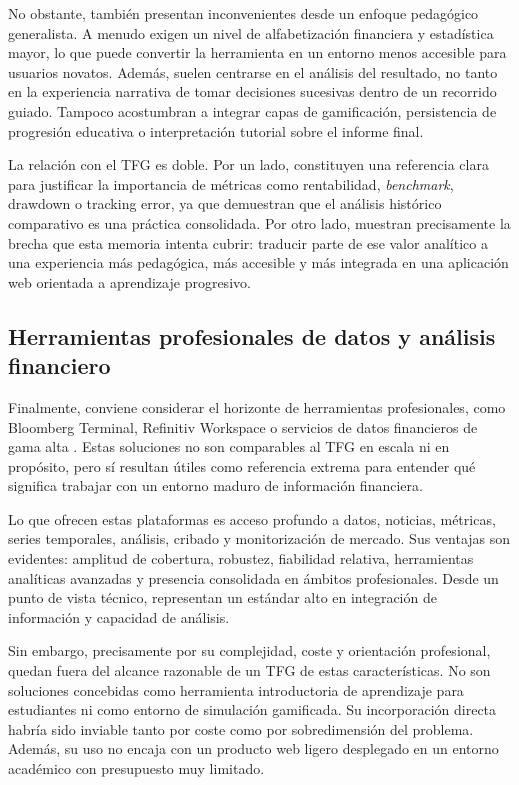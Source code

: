 No obstante, también presentan inconvenientes desde un enfoque pedagógico generalista. A menudo exigen un nivel de alfabetización financiera y estadística mayor, lo que puede convertir la herramienta en un entorno menos accesible para usuarios novatos. Además, suelen centrarse en el análisis del resultado, no tanto en la experiencia narrativa de tomar decisiones sucesivas dentro de un recorrido guiado. Tampoco acostumbran a integrar capas de gamificación, persistencia de progresión educativa o interpretación tutorial sobre el informe final.

La relación con el TFG es doble. Por un lado, constituyen una referencia clara para justificar la importancia de métricas como rentabilidad, \textit{benchmark}, drawdown o tracking error, ya que demuestran que el análisis histórico comparativo es una práctica consolidada. Por otro lado, muestran precisamente la brecha que esta memoria intenta cubrir: traducir parte de ese valor analítico a una experiencia más pedagógica, más accesible y más integrada en una aplicación web orientada a aprendizaje progresivo.

\subsection{Herramientas profesionales de datos y análisis financiero}

Finalmente, conviene considerar el horizonte de herramientas profesionales, como Bloomberg Terminal, Refinitiv Workspace o servicios de datos financieros de gama alta \cite{bloomberg,refinitiv}. Estas soluciones no son comparables al TFG en escala ni en propósito, pero sí resultan útiles como referencia extrema para entender qué significa trabajar con un entorno maduro de información financiera.

Lo que ofrecen estas plataformas es acceso profundo a datos, noticias, métricas, series temporales, análisis, cribado y monitorización de mercado. Sus ventajas son evidentes: amplitud de cobertura, robustez, fiabilidad relativa, herramientas analíticas avanzadas y presencia consolidada en ámbitos profesionales. Desde un punto de vista técnico, representan un estándar alto en integración de información y capacidad de análisis.

Sin embargo, precisamente por su complejidad, coste y orientación profesional, quedan fuera del alcance razonable de un TFG de estas características. No son soluciones concebidas como herramienta introductoria de aprendizaje para estudiantes ni como entorno de simulación gamificada. Su incorporación directa habría sido inviable tanto por coste como por sobredimensión del problema. Además, su uso no encaja con un producto web ligero desplegado en un entorno académico con presupuesto muy limitado.

